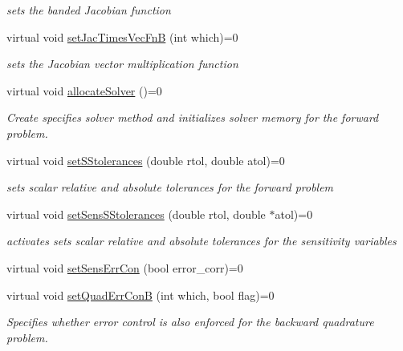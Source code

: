 \begin{DoxyCompactItemize}
\begin{DoxyCompactList}\small\item\em sets the banded Jacobian function \end{DoxyCompactList}\item 
virtual void \mbox{\hyperlink{classamici_1_1_solver_a2c30d06de7f3f5f452dc80d5f03db9d7}{set\+Jac\+Times\+Vec\+FnB}} (int which)=0
\begin{DoxyCompactList}\small\item\em sets the Jacobian vector multiplication function \end{DoxyCompactList}\item 
\mbox{\label{classamici_1_1_solver_a0ae4930d2f6fa37ebcc55e334012fd6d}} 
virtual void \mbox{\hyperlink{classamici_1_1_solver_a0ae4930d2f6fa37ebcc55e334012fd6d}{allocate\+Solver}} ()=0
\begin{DoxyCompactList}\small\item\em Create specifies solver method and initializes solver memory for the forward problem. \end{DoxyCompactList}\item 
virtual void \mbox{\hyperlink{classamici_1_1_solver_a6a688afa51ec71eded6c8801faaafac3}{set\+S\+Stolerances}} (double rtol, double atol)=0
\begin{DoxyCompactList}\small\item\em sets scalar relative and absolute tolerances for the forward problem \end{DoxyCompactList}\item 
virtual void \mbox{\hyperlink{classamici_1_1_solver_a16ec3b994dd433e71fcb58eea3cd529f}{set\+Sens\+S\+Stolerances}} (double rtol, double $\ast$atol)=0
\begin{DoxyCompactList}\small\item\em activates sets scalar relative and absolute tolerances for the sensitivity variables \end{DoxyCompactList}\item 
virtual void \mbox{\hyperlink{classamici_1_1_solver_a1928530b3110cb9229d6836c5389379f}{set\+Sens\+Err\+Con}} (bool error\+\_\+corr)=0
\item 
virtual void \mbox{\hyperlink{classamici_1_1_solver_a0d5e55201b30383f1272146935f43c78}{set\+Quad\+Err\+ConB}} (int which, bool flag)=0
\begin{DoxyCompactList}\small\item\em Specifies whether error control is also enforced for the backward quadrature problem. \end{DoxyCompactList}\item 

\end{DoxyCompactItemize}
